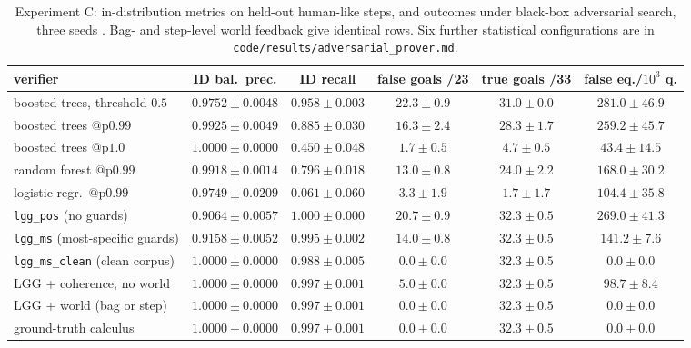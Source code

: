 \begin{table}[ht]
\centering\footnotesize
\setlength{\tabcolsep}{4pt}
\begin{tabular}{@{}lccccc@{}}
\toprule
verifier & ID bal.\ prec. & ID recall & false goals /23 & true goals /33 & false eq./$10^3$ q.\\
\midrule
boosted trees, threshold $0.5$ & $0.9752\pm0.0048$ & $0.958\pm0.003$ & $22.3\pm0.9$ & $31.0\pm0.0$ & $281.0\pm46.9$\\
boosted trees $@\mathrm p0.99$ & $0.9925\pm0.0049$ & $0.885\pm0.030$ & $16.3\pm2.4$ & $28.3\pm1.7$ & $259.2\pm45.7$\\
boosted trees $@\mathrm p1.0$ & $1.0000\pm0.0000$ & $0.450\pm0.048$ & $1.7\pm0.5$ & $4.7\pm0.5$ & $43.4\pm14.5$\\
random forest $@\mathrm p0.99$ & $0.9918\pm0.0014$ & $0.796\pm0.018$ & $13.0\pm0.8$ & $24.0\pm2.2$ & $168.0\pm30.2$\\
logistic regr.\ $@\mathrm p0.99$ & $0.9749\pm0.0209$ & $0.061\pm0.060$ & $3.3\pm1.9$ & $1.7\pm1.7$ & $104.4\pm35.8$\\
\addlinespace
\texttt{lgg\_pos} (no guards) & $0.9064\pm0.0057$ & $1.000\pm0.000$ & $20.7\pm0.9$ & $32.3\pm0.5$ & $269.0\pm41.3$\\
\texttt{lgg\_ms} (most-specific guards) & $0.9158\pm0.0052$ & $0.995\pm0.002$ & $14.0\pm0.8$ & $32.3\pm0.5$ & $141.2\pm7.6$\\
\texttt{lgg\_ms\_clean} (clean corpus) & $1.0000\pm0.0000$ & $0.988\pm0.005$ & $0.0\pm0.0$ & $32.3\pm0.5$ & $0.0\pm0.0$\\
LGG + coherence, no world & $1.0000\pm0.0000$ & $0.997\pm0.001$ & $5.0\pm0.0$ & $32.3\pm0.5$ & $98.7\pm8.4$\\
LGG + world (bag or step) & $1.0000\pm0.0000$ & $0.997\pm0.001$ & $0.0\pm0.0$ & $32.3\pm0.5$ & $0.0\pm0.0$\\
ground-truth calculus & $1.0000\pm0.0000$ & $0.997\pm0.001$ & $0.0\pm0.0$ & $32.3\pm0.5$ & $0.0\pm0.0$\\
\bottomrule
\end{tabular}
\caption{Experiment C: in-distribution metrics on held-out human-like steps, and outcomes under black-box adversarial search, three seeds . Bag- and step-level world feedback give identical rows. Six further statistical configurations are in \texttt{code/results/adversarial\_prover.md}.}
\label{tab:experiments:adversarial}
\end{table}

